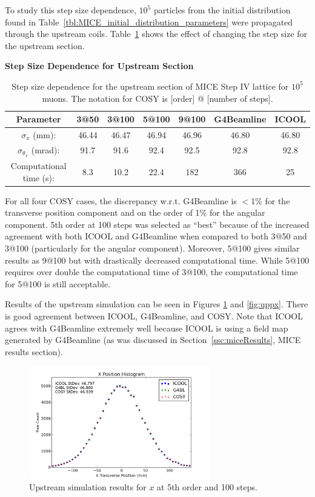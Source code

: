 To study this step size dependence, $10^5$ particles from the initial distribution found in Table~\ref{tbl:MICE_initial_distribution_parameters} were propagated through the upstream coils. Table~\ref{tbl:mice_step_size_upstream} shows the effect of changing the step size for the upstream section.

\begin{table}
\caption*{\textbf{Step Size Dependence for Upstream Section}}
\begin{center}
\begin{tabularx}{\textwidth}{ccccccc}
\hline \hline
Parameter & 3@50 & 3@100 & 5@100 & 9@100 & G4Beamline & ICOOL\\
\hline
$\sigma_x$ (mm): & 46.44 & 46.47 & 46.94 & 46.96 & 46.80 & 46.80\\
$\sigma_{\theta_x}$ (mrad): & 91.7 & 91.6 & 92.4 & 92.5 & 92.8 & 92.8\\
Computational time (s): & 8.3 & 10.2 & 22.4 & 182 & 366 & 25\\
\hline
\end{tabularx}
\end{center}
\caption[Step size dependence for the upstream section of MICE Step IV lattice.]{Step size dependence for the upstream section of MICE Step IV lattice for $10^5$ muons. The notation for COSY is [order] @ [number of steps].}
\label{tbl:mice_step_size_upstream}
\end{table}

For all four COSY cases, the discrepancy w.r.t. G4Beamline is  $<$1\% for the transverse position component and on the order of 1\% for the angular component. 5th order at 100 steps was selected as ``best'' because of the increased agreement with both ICOOL and G4Beamline when compared to both 3@50 and 3@100 (particularly for the angular component). Moreover, 5@100 gives similar results as 9@100 but with drastically decreased computational time. While 5@100 requires over double the computational time of 3@100, the computational time for 5@100 is still acceptable.

Results of the upstream simulation can be seen in Figures \ref{fig:upx} and \ref{fig:uppx}. There is good agreement between ICOOL, G4Beamline, and COSY. Note that ICOOL agrees with G4Beamline extremely well because ICOOL is using a field map generated by G4Beamline (as was discussed in Section~\ref{ssc:miceResults}, MICE results section).

\begin{figure}[H]
  \centering
    \includegraphics[width=0.7\textwidth]{MICE data/upstream/x} 
  \caption{Upstream simulation results for $x$ at 5th order and 100 steps.}
  \label{fig:upx}
\end{figure}

